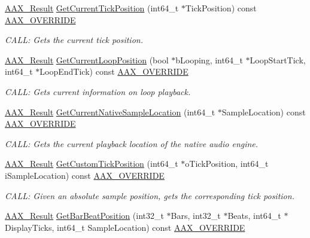 \begin{DoxyCompactItemize}
\mbox{\hyperlink{a00392_a4d8f69a697df7f70c3a8e9b8ee130d2f}{A\+A\+X\+\_\+\+Result}} \mbox{\hyperlink{a01941_a1e46d5b0d2c1809ca4bd185703e64091}{Get\+Current\+Tick\+Position}} (int64\+\_\+t $\ast$Tick\+Position) const \mbox{\hyperlink{a00392_ac2f24a5172689ae684344abdcce55463}{A\+A\+X\+\_\+\+O\+V\+E\+R\+R\+I\+DE}}
\begin{DoxyCompactList}\small\item\em C\+A\+LL\+: Gets the current tick position. \end{DoxyCompactList}\item 
\mbox{\hyperlink{a00392_a4d8f69a697df7f70c3a8e9b8ee130d2f}{A\+A\+X\+\_\+\+Result}} \mbox{\hyperlink{a01941_a9f0b2791d55b047df387fabf0026ca59}{Get\+Current\+Loop\+Position}} (bool $\ast$b\+Looping, int64\+\_\+t $\ast$Loop\+Start\+Tick, int64\+\_\+t $\ast$Loop\+End\+Tick) const \mbox{\hyperlink{a00392_ac2f24a5172689ae684344abdcce55463}{A\+A\+X\+\_\+\+O\+V\+E\+R\+R\+I\+DE}}
\begin{DoxyCompactList}\small\item\em C\+A\+LL\+: Gets current information on loop playback. \end{DoxyCompactList}\item 
\mbox{\hyperlink{a00392_a4d8f69a697df7f70c3a8e9b8ee130d2f}{A\+A\+X\+\_\+\+Result}} \mbox{\hyperlink{a01941_ac15e5401cc221dd76f5a1260b6014148}{Get\+Current\+Native\+Sample\+Location}} (int64\+\_\+t $\ast$Sample\+Location) const \mbox{\hyperlink{a00392_ac2f24a5172689ae684344abdcce55463}{A\+A\+X\+\_\+\+O\+V\+E\+R\+R\+I\+DE}}
\begin{DoxyCompactList}\small\item\em C\+A\+LL\+: Gets the current playback location of the native audio engine. \end{DoxyCompactList}\item 
\mbox{\hyperlink{a00392_a4d8f69a697df7f70c3a8e9b8ee130d2f}{A\+A\+X\+\_\+\+Result}} \mbox{\hyperlink{a01941_ac8d91d58001ae11f423342f96afe72f4}{Get\+Custom\+Tick\+Position}} (int64\+\_\+t $\ast$o\+Tick\+Position, int64\+\_\+t i\+Sample\+Location) const \mbox{\hyperlink{a00392_ac2f24a5172689ae684344abdcce55463}{A\+A\+X\+\_\+\+O\+V\+E\+R\+R\+I\+DE}}
\begin{DoxyCompactList}\small\item\em C\+A\+LL\+: Given an absolute sample position, gets the corresponding tick position. \end{DoxyCompactList}\item 
\mbox{\hyperlink{a00392_a4d8f69a697df7f70c3a8e9b8ee130d2f}{A\+A\+X\+\_\+\+Result}} \mbox{\hyperlink{a01941_a7a46037d58f09cdd5a25bd5c5131876b}{Get\+Bar\+Beat\+Position}} (int32\+\_\+t $\ast$Bars, int32\+\_\+t $\ast$Beats, int64\+\_\+t $\ast$Display\+Ticks, int64\+\_\+t Sample\+Location) const \mbox{\hyperlink{a00392_ac2f24a5172689ae684344abdcce55463}{A\+A\+X\+\_\+\+O\+V\+E\+R\+R\+I\+DE}}

\end{DoxyCompactItemize}
